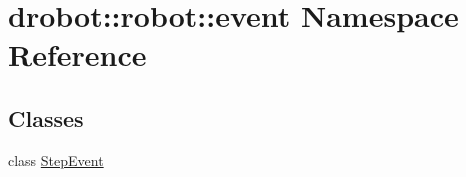 \hypertarget{namespacedrobot_1_1robot_1_1event}{\section{drobot\-:\-:robot\-:\-:event Namespace Reference}
\label{namespacedrobot_1_1robot_1_1event}
}
\subsection*{Classes}
\begin{DoxyCompactItemize}
\item 
class \hyperlink{classdrobot_1_1robot_1_1event_1_1StepEvent}{Step\-Event}
\end{DoxyCompactItemize}

